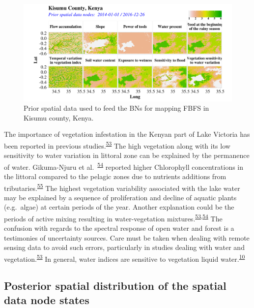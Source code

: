 \documentclass[12pt,oneside]{article}
\begin{document}
\begin{figure}
\includegraphics[width=1\linewidth]{figures/Mapping_FBFS_prior_maps} \caption{Prior spatial data used to feed the BNs for mapping FBFS in Kisumu county, Kenya.}\label{fig:fig11}
\end{figure}

The importance of vegetation infestation in the Kenyan part of Lake Victoria has been reported in previous studies.\textsuperscript{\protect\hyperlink{ref-Cavalli_et_al_2009}{53}} The high vegetation along with its low sensitivity to water variation in littoral zone can be explained by the permanence of water. Gikuma-Njuru et al.~\textsuperscript{\protect\hyperlink{ref-Gikuma-Njuru_et_al_2005}{54}} reported higher Chlorophyll concentrations in the littoral compared to the pelagic zones due to nutrients additions from tributaries.\textsuperscript{\protect\hyperlink{ref-World_Bank_1996}{55}} The highest vegetation variability associated with the lake water may be explained by a sequence of proliferation and decline of aquatic plants (e.g.~algae) at certain periods of the year. Another explanation could be the periods of active mixing resulting in water-vegetation mixtures.\textsuperscript{\protect\hyperlink{ref-Cavalli_et_al_2009}{53},\protect\hyperlink{ref-Gikuma-Njuru_et_al_2005}{54}} The confusion with regards to the spectral response of open water and forest is a testimonies of uncertainty sources. Care must be taken when dealing with remote sensing data to avoid such errors, particularly in studies dealing with water and vegetation.\textsuperscript{\protect\hyperlink{ref-Cavalli_et_al_2009}{53}} In general, water indices are sensitive to vegetation liquid water.\textsuperscript{\protect\hyperlink{ref-Boschetti_et_al_2014}{10}}

\hypertarget{II5}{%
\subsection{Posterior spatial distribution of the spatial data node states}\label{II5}}
\end{document}
